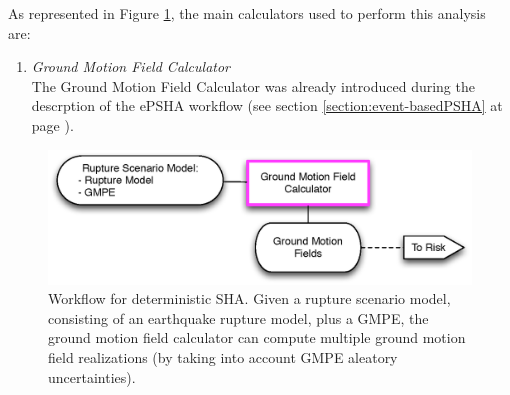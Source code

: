 As represented in Figure \ref{deterministic_workflow}, the main calculators 
used to perform this analysis are:
\begin{enumerate}
\item \emph{Ground Motion Field Calculator} \hfill \\
The Ground Motion Field Calculator was already 
introduced during the descrption of the ePSHA workflow (see section 
\ref{section:event-basedPSHA} at page \pageref{section:classicalPSHA}).
\end{enumerate}
\begin{figure}[!hb]
\centering
\includegraphics[width=12cm]{./Figures/Part_Hazard/deterministic_workflow.eps}
\caption{Workflow for deterministic SHA. Given a rupture scenario model, 
consisting of an earthquake rupture model, plus a GMPE, the ground motion 
field calculator can compute multiple ground motion field realizations (by 
taking into account GMPE aleatory uncertainties).}
\label{deterministic_workflow}
\end{figure}
%
%
%

